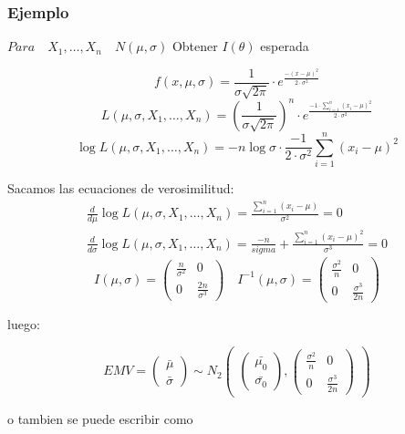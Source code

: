\subsubsection*{Ejemplo}
\(
Para \quad X_1,\dots,X_n \quad N(\mu,\sigma) 
\)
Obtener $I(\theta)$ esperada

\[
f(x,\mu,\sigma)=\frac{1}{\sigma \sqrt{2 \pi}} \cdot e^{\frac{-(x-\mu)^2}{2 \cdot \sigma^2}}
\]\[ L(\mu,\sigma,X_1,\dots,X_n)= (\frac{1}{\sigma \sqrt{2 \pi}})^n \cdot e^{\frac{-1 \cdot \sum_{i=1}^{n}(x_i-\mu)^2}{2 \cdot \sigma^2}}
\]\[ \log L(\mu,\sigma,X_1,\dots,X_n)= -n \log \sigma \cdot \frac{-1}{2 \cdot \sigma^2} \sum_{i=1}^{n}(x_i-\mu)^2
\]

Sacamos las ecuaciones de verosimilitud:
\[
\begin{matrix}
    \frac{d}{d \mu} \log L(\mu,\sigma,X_1,\dots,X_n)=\frac{\sum_{i=1}^{n} (x_i-\mu)}{\sigma^2}=0 \\
    \frac{d}{d \sigma} \log L(\mu,\sigma,X_1,\dots,X_n)=\frac{-n}{sigma}+ \frac{\sum_{i=1}^{n}(x_i-\mu)^2}{\sigma^3}=0
\end{matrix}
\]
\[
I(\mu,\sigma)=
\begin{pmatrix}
    \frac{n}{\sigma^2} & 0\\
    0 & \frac{2n}{\sigma^3}
\end{pmatrix}
\quad I^{-1}(\mu,\sigma)=
\begin{pmatrix}
    \frac{\sigma^2}{n} & 0\\
    0 & \frac{\sigma^3}{2n}
\end{pmatrix}
\]

luego:

\[
EMV=
\begin{pmatrix}
    \bar{\mu}\\
    \bar{\sigma}
\end{pmatrix}
\sim N_2
\begin{pmatrix}

\begin{pmatrix}
    \bar{\mu_0}\\
    \bar{\sigma_0}
\end{pmatrix}
,
\begin{pmatrix}
    \frac{\sigma^2}{n} & 0\\
    0 & \frac{\sigma^3}{2n}
\end{pmatrix}
    
\end{pmatrix}
\]

o tambien se puede escribir como


